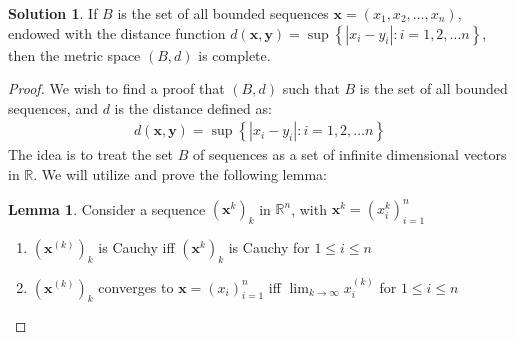 \documentclass[12pt]{article}
\theoremstyle{definition} %
\newtheorem{solution}{Solution}
\newtheorem{lemma}{Lemma}
\theoremstyle{plain} %
\begin{document}
\begin{solution}
        If $B$ is the set of all bounded sequences $\mathbf{x} = (x_{1}, x_{2}, \ldots, x_n )$, endowed with the distance function $d(\mathbf{x}, \mathbf{y})=\sup \left\{ \left\vert x_i - y_{i} \right\vert : i=1,2, \ldots n \right\}$, then the metric space $(B,d)$ is complete.
    \begin{proof}

        We wish to find a proof that $(B, d)$ such that $B$ is the set of all bounded sequences, and $d$ is the distance defined as:
        \begin{align}
            d(\mathbf{x}, \mathbf{y})=\sup \left\{ \left\vert x_i - y_{i} \right\vert : i=1,2, \ldots n \right\} 
        \end{align} 
        The idea is to treat the set $B$ of sequences as a set of infinite dimensional vectors in $\mathbb{{R}} $. 
        We will utilize and prove the following lemma: 
\begin{lemma}
            Consider a sequence $(\mathbf{x}^{k})_k$ in $\mathbb{{R}}^n$, with $\mathbf{x}^{k}=(x_i^{k})^{n}_{i=1}$   
\end{lemma}
            \begin{enumerate}
                \item $(\textbf{x}^{(k)})_{k}$ is Cauchy iff $(\textbf{x}^{k})_{k}$  is Cauchy for $1 \leq i \leq n $
                \item $(\textbf{x}^{(k)})_{k}$ converges to $\mathbf{x} = (x_{i})^{n}_{i=1}$ iff $\lim_{k \to \infty} x_{i}^{(k)}$ for $1 \leq i \leq n $ 
            \end{enumerate} 


\end{proof}
\end{solution}
\end{document}
